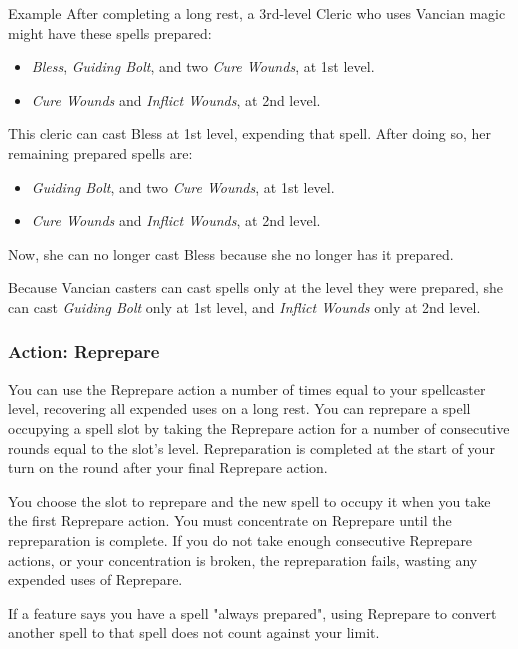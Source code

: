 \documentclass[letterpaper,twocolumn,openany,nodeprecatedcode,bg=print]{dndbook}
\begin{document}
\begin{DndComment}{Example}
After completing a long rest, a 3rd-level Cleric who uses Vancian magic might have these spells prepared:

\begin{itemize}
\item \textit{Bless}, \textit{Guiding Bolt}, and two \textit{Cure Wounds}, at 1st level.
\item \textit{Cure Wounds} and \textit{Inflict Wounds}, at 2nd level.
\end{itemize}

\noindent This cleric can cast Bless at 1st level, expending that spell. After doing so, her remaining prepared spells are:

\begin{itemize}
\item \textit{Guiding Bolt}, and two \textit{Cure Wounds}, at 1st level.
\item \textit{Cure Wounds} and \textit{Inflict Wounds}, at 2nd level.
\end{itemize}

\noindent Now, she can no longer cast Bless because she no longer has it prepared. 

Because Vancian casters can cast spells only at the level they were prepared, she can cast \textit{Guiding Bolt} only at 1st level, and \textit{Inflict Wounds} only at 2nd level.
\end{DndComment}

\subsubsection{Action: Reprepare}
You can use the Reprepare action a number of times equal to your spellcaster level, recovering all expended uses on a long rest. You can reprepare a spell occupying a spell slot by taking the Reprepare action for a number of consecutive rounds equal to the slot's level. Repreparation is completed at the start of your turn on the round after your final Reprepare action. 

You choose the slot to reprepare and the new spell to occupy it when you take the first Reprepare action. You must concentrate on Reprepare until the repreparation is complete. If you do not take enough consecutive Reprepare actions, or your concentration is broken, the repreparation fails, wasting any expended uses of Reprepare.

If a feature says you have a spell "always prepared", using Reprepare to convert another spell to that spell does not count against your limit.
\end{document}

